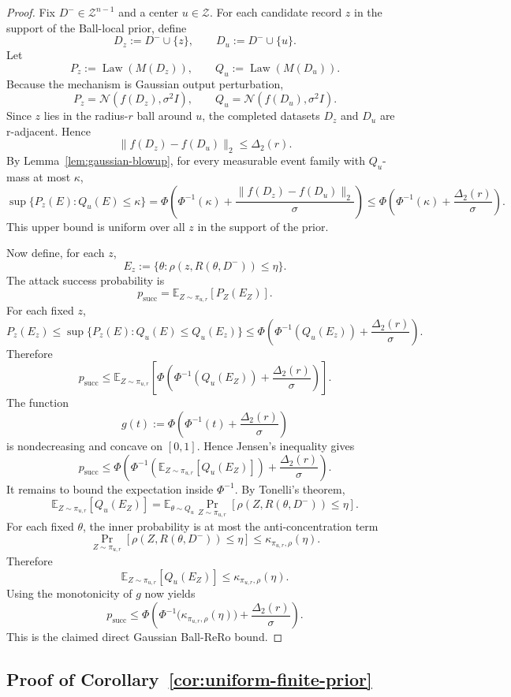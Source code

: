 \documentclass[conference,compsoc]{IEEEtran}
\DeclareMathOperator{\Law}{Law}
\begin{document}
\begin{proof}
Fix $D^-\in\mathcal{Z}^{n-1}$ and a center $u\in\mathcal{Z}$. For each candidate record $z$ in the support of the Ball-local prior, define
\[
D_z:=D^-\cup\{z\},
\qquad
D_u:=D^-\cup\{u\}.
\]
Let
\[
P_z:=\Law(M(D_z)),
\qquad
Q_u:=\Law(M(D_u)).
\]
Because the mechanism is Gaussian output perturbation,
\[
P_z=\mathcal{N}(f(D_z),\sigma^2 I),
\qquad
Q_u=\mathcal{N}(f(D_u),\sigma^2 I).
\]
Since $z$ lies in the radius-$r$ ball around $u$, the completed datasets $D_z$ and $D_u$ are r-adjacent. Hence
\[
\|f(D_z)-f(D_u)\|_2\le \Delta_2(r).
\]
By Lemma~\ref{lem:gaussian-blowup}, for every measurable event family with $Q_u$-mass at most $\kappa$,
\[
\sup\{P_z(E):Q_u(E)\le \kappa\}
=
\Phi\!\left(\Phi^{-1}(\kappa)+\frac{\|f(D_z)-f(D_u)\|_2}{\sigma}\right)
\le
\Phi\!\left(\Phi^{-1}(\kappa)+\frac{\Delta_2(r)}{\sigma}\right).
\]
This upper bound is uniform over all $z$ in the support of the prior.

Now define, for each $z$,
\[
E_z:=\{\theta: \rho(z,R(\theta,D^-))\le \eta\}.
\]
The attack success probability is
\[
p_{\mathrm{succ}}
=
\mathbb{E}_{Z\sim\pi_{u,r}}[P_Z(E_Z)].
\]
For each fixed $z$,
\[
P_z(E_z)
\le
\sup\{P_z(E):Q_u(E)\le Q_u(E_z)\}
\le
\Phi\!\left(\Phi^{-1}(Q_u(E_z))+\frac{\Delta_2(r)}{\sigma}\right).
\]
Therefore
\[
p_{\mathrm{succ}}
\le
\mathbb{E}_{Z\sim\pi_{u,r}}
\left[
\Phi\!\left(\Phi^{-1}(Q_u(E_Z))+\frac{\Delta_2(r)}{\sigma}\right)
\right].
\]
The function
\[
g(t):=\Phi\!\left(\Phi^{-1}(t)+\frac{\Delta_2(r)}{\sigma}\right)
\]
is nondecreasing and concave on $[0,1]$. Hence Jensen's inequality gives
\[
p_{\mathrm{succ}}
\le
\Phi\!\left(
\Phi^{-1}\!\left(\mathbb{E}_{Z\sim\pi_{u,r}}[Q_u(E_Z)]\right)+\frac{\Delta_2(r)}{\sigma}
\right).
\]
It remains to bound the expectation inside $\Phi^{-1}$. By Tonelli's theorem,
\[
\mathbb{E}_{Z\sim\pi_{u,r}}[Q_u(E_Z)]
=
\mathbb{E}_{\theta\sim Q_u}
\Pr_{Z\sim\pi_{u,r}}[\rho(Z,R(\theta,D^-))\le \eta].
\]
For each fixed $\theta$, the inner probability is at most the anti-concentration term
\[
\Pr_{Z\sim\pi_{u,r}}[\rho(Z,R(\theta,D^-))\le \eta]
\le
\kappa_{\pi_{u,r},\rho}(\eta).
\]
Therefore
\[
\mathbb{E}_{Z\sim\pi_{u,r}}[Q_u(E_Z)]
\le
\kappa_{\pi_{u,r},\rho}(\eta).
\]
Using the monotonicity of $g$ now yields
\[
p_{\mathrm{succ}}
\le
\Phi\!\left(
\Phi^{-1}\!\big(\kappa_{\pi_{u,r},\rho}(\eta)\big)+\frac{\Delta_2(r)}{\sigma}
\right).
\]
This is the claimed direct Gaussian Ball-ReRo bound.
\end{proof}

\subsection{Proof of Corollary~\ref{cor:uniform-finite-prior}}
\end{document}
